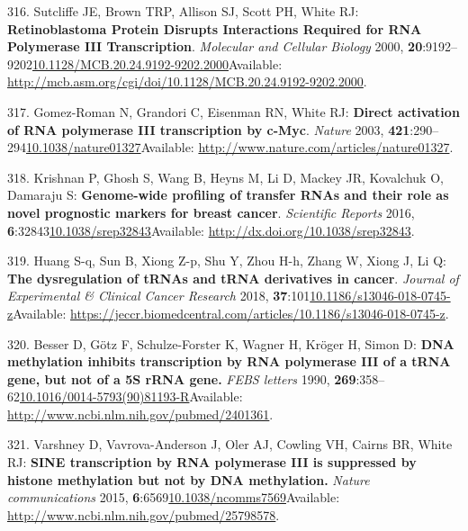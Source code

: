 \documentclass[
]{book}
\begin{document}
\leavevmode\hypertarget{ref-Sutcliffe2000}{}%
316. Sutcliffe JE, Brown TRP, Allison SJ, Scott PH, White RJ: \textbf{Retinoblastoma Protein Disrupts Interactions Required for RNA Polymerase III Transcription}. \emph{Molecular and Cellular Biology} 2000, \textbf{20}:9192--9202\href{https://doi.org/10.1128/MCB.20.24.9192-9202.2000}{10.1128/MCB.20.24.9192-9202.2000}Available: \url{http://mcb.asm.org/cgi/doi/10.1128/MCB.20.24.9192-9202.2000}.

\leavevmode\hypertarget{ref-Gomez-Roman2003}{}%
317. Gomez-Roman N, Grandori C, Eisenman RN, White RJ: \textbf{Direct activation of RNA polymerase III transcription by c-Myc}. \emph{Nature} 2003, \textbf{421}:290--294\href{https://doi.org/10.1038/nature01327}{10.1038/nature01327}Available: \url{http://www.nature.com/articles/nature01327}.

\leavevmode\hypertarget{ref-Krishnan2016}{}%
318. Krishnan P, Ghosh S, Wang B, Heyns M, Li D, Mackey JR, Kovalchuk O, Damaraju S: \textbf{Genome-wide profiling of transfer RNAs and their role as novel prognostic markers for breast cancer}. \emph{Scientific Reports} 2016, \textbf{6}:32843\href{https://doi.org/10.1038/srep32843}{10.1038/srep32843}Available: \url{http://dx.doi.org/10.1038/srep32843}.

\leavevmode\hypertarget{ref-Huang2018}{}%
319. Huang S-q, Sun B, Xiong Z-p, Shu Y, Zhou H-h, Zhang W, Xiong J, Li Q: \textbf{The dysregulation of tRNAs and tRNA derivatives in cancer}. \emph{Journal of Experimental \& Clinical Cancer Research} 2018, \textbf{37}:101\href{https://doi.org/10.1186/s13046-018-0745-z}{10.1186/s13046-018-0745-z}Available: \url{https://jeccr.biomedcentral.com/articles/10.1186/s13046-018-0745-z}.

\leavevmode\hypertarget{ref-Besser1990}{}%
320. Besser D, Götz F, Schulze-Forster K, Wagner H, Kröger H, Simon D: \textbf{DNA methylation inhibits transcription by RNA polymerase III of a tRNA gene, but not of a 5S rRNA gene.} \emph{FEBS letters} 1990, \textbf{269}:358--62\href{https://doi.org/10.1016/0014-5793(90)81193-R}{10.1016/0014-5793(90)81193-R}Available: \url{http://www.ncbi.nlm.nih.gov/pubmed/2401361}.

\leavevmode\hypertarget{ref-Varshney2015}{}%
321. Varshney D, Vavrova-Anderson J, Oler AJ, Cowling VH, Cairns BR, White RJ: \textbf{SINE transcription by RNA polymerase III is suppressed by histone methylation but not by DNA methylation.} \emph{Nature communications} 2015, \textbf{6}:6569\href{https://doi.org/10.1038/ncomms7569}{10.1038/ncomms7569}Available: \url{http://www.ncbi.nlm.nih.gov/pubmed/25798578}.
\end{document}
